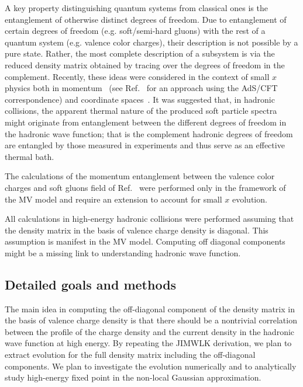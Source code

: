 	A key property distinguishing 
	quantum systems from classical ones is the entanglement 
	of otherwise distinct degrees of freedom. 
	Due to entanglement of certain degrees of freedom (e.g. soft/semi-hard gluons) 
	with the rest of a quantum system (e.g. valence color charges), their description
	is not possible by a pure state. 
	Rather, the most complete description of a subsystem 
 	is via the reduced density matrix
	obtained 
	by tracing over the degrees of freedom in the complement. 
	Recently, these ideas 
	were considered in the context of small $x$ physics 
	both in momentum~\cite{Kovner:2015hga} (see Ref.~\cite{Liu:2018gae} 
	for an approach using the AdS/CFT correspondence) and coordinate spaces~\cite{Kharzeev:2017qzs,Hagiwara:2017uaz}. 
	It was suggested that, in hadronic collisions,  the 
	apparent thermal nature of the produced soft 
	particle spectra
	might originate  from entanglement between the different 
	degrees of freedom in the hadronic wave function; 
	that is the complement hadronic degrees of freedom 
	are entangled by those measured in experiments 
	and thus serve as an effective thermal bath. 


	The calculations of the momentum entanglement 
	between the valence color charges and soft gluons field 
 	of Ref.~\cite{Kovner:2015hga} were performed only in the framework of the 
	MV model and require an extension to account for small $x$ evolution. 

	All calculations in high-energy hadronic collisions 
	were performed assuming that the density matrix  in the basis 
	of valence charge density is diagonal. This assumption 
	is manifest in the MV model. Computing off diagonal 
	components might be a missing link to understanding 
	hadronic wave function. 


    \vspace{0.5em}
    \subsection{Detailed goals and methods}
        \label{sec:p21}
	The main idea in computing the off-diagonal component of the density matrix 
	in the basis  of valence charge density is that there should be a nontrivial 
	correlation between the profile of the charge density 
	and the current density in the hadronic wave function at high energy. 
	By repeating the JIMWLK derivation, we plan to extract evolution
	for the full density matrix including the off-diagonal components. We plan to investigate 
	the evolution numerically and to analytically study %
	high-energy fixed point in the non-local Gaussian approximation.  


